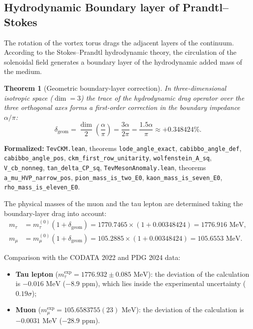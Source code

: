 \documentclass[11pt,a4paper]{article}
\newtheorem{theorem}{Theorem}
\theoremstyle{definition}
\theoremstyle{remark}
\begin{document}
\subsection{Hydrodynamic Boundary layer of Prandtl--Stokes}
	
The rotation of the vortex torus drags the adjacent layers of the continuum. According to the Stokes--Prandtl hydrodynamic theory, the circulation of the solenoidal field generates a boundary layer of the hydrodynamic added mass of the medium.
	
\begin{theorem}[Geometric boundary-layer correction]
\label{thm:stokes_boundary_layer}
In three-dimensional isotropic space ($\dim = 3$) the trace of the hydrodynamic drag operator over the three orthogonal axes forms a first-order correction in the boundary impedance $\alpha/\pi$:
\begin{equation}
	\delta_{\mathrm{geom}} = \frac{\dim}{2} \left(\frac{\alpha}{\pi}\right) = \frac{3\alpha}{2\pi} = \frac{1.5\alpha}{\pi} \approx +0.348424\%.
	\label{eq:stokes_boundary_layer_exact}
\end{equation}
\end{theorem}

\noindent\small\textbf{Formalized:} \texttt{TevCKM.lean}, theorems \texttt{lode_angle_exact}, \texttt{cabibbo_angle_def}, \texttt{cabibbo_angle_pos}, \texttt{ckm_first_row_unitarity}, \texttt{wolfenstein_A_sq}, \texttt{V_cb_nonneg}, \texttt{tan_delta_CP_sq}, \texttt{TevMesonAnomaly.lean}, theorems \texttt{a_mu_HVP_narrow_pos}, \texttt{pion_mass_is_two_E0}, \texttt{kaon_mass_is_seven_E0}, \texttt{rho_mass_is_eleven_E0}.

The physical masses of the muon and the tau lepton are determined taking the boundary-layer drag into account:
\begin{align}
m_\tau &= m_\tau^{(0)} (1 + \delta_{\mathrm{geom}}) = 1770.7465 \times (1 + 0.00348424) = 1776.916\text{ MeV}, \label{eq:tau_dressed_calc} \\
m_\mu  &= m_\mu^{(0)} (1 + \delta_{\mathrm{geom}}) = 105.2885 \times (1 + 0.00348424) = 105.6553\text{ MeV}. \label{eq:muon_dressed_calc}
\end{align}
	
Comparison with the CODATA 2022 and PDG 2024 data:
\begin{itemize}
\item \textbf{Tau lepton} ($m_\tau^{\mathrm{exp}} = 1776.932 \pm 0.085\text{ MeV}$): the deviation of the calculation is $-0.016\text{ MeV}$ ($-8.9\text{ ppm}$), which lies inside the experimental uncertainty ($0.19\sigma$);
\item \textbf{Muon} ($m_\mu^{\mathrm{exp}} = 105.6583755(23)\text{ MeV}$): the deviation of the calculation is $-0.0031\text{ MeV}$ ($-28.9\text{ ppm}$).
\end{itemize}
\end{document}
